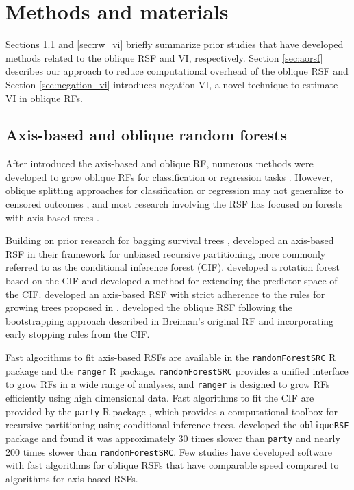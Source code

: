 \documentclass[12pt]{article}\usepackage[]{graphicx}\usepackage[]{xcolor}
\newcommand{\eg}{\textit{e.g.}}
\newcommand{\secref}[1]{Section \ref{#1}}
\begin{document}
\section{Methods and materials} \label{sec:methods}

Sections \ref{sec:rw_forests} and \ref{sec:rw_vi} briefly summarize prior studies that have developed methods related to the oblique RSF and VI, respectively. \secref{sec:aorsf} describes our approach to reduce computational overhead of the oblique RSF and \secref{sec:negation_vi} introduces negation VI, a novel technique to estimate VI in oblique RFs.

\subsection{Axis-based and oblique random forests} \label{sec:rw_forests}

After \citet{breiman2001random} introduced the axis-based and oblique RF, numerous methods were developed to grow oblique RFs for classification or regression tasks \citep{menze2011oblique, zhang2014oblique, rainforth2015canonical, zhu2015reinforcement, poona2016investigating, qiu2017oblique, tomita2020sparse, katuwal2020heterogeneous}. However, oblique splitting approaches for classification or regression may not generalize to censored outcomes \citep[\eg, see][Section~4.5.1]{zhu2013tree}, and most research involving the RSF has focused on forests with axis-based trees \citep{wang2017selective}.

Building on prior research for bagging survival trees \citep{hothorn2004bagging}, \citet{hothorn2006unbiased} developed an axis-based RSF in their framework for unbiased recursive partitioning, more commonly referred to as the conditional inference forest (CIF). \citet{zhou2016random} developed a rotation forest based on the CIF and \citet{wang2017random} developed a method for extending the predictor space of the CIF. \citet{ishwaran2008random} developed an axis-based RSF with strict adherence to the rules for growing trees proposed in \citet{breiman2001random}.  \citet{jaeger2019oblique} developed the oblique RSF following the bootstrapping approach described in Breiman's original RF and incorporating early stopping rules from the CIF.

Fast algorithms to fit axis-based RSFs are available in the \texttt{randomForestSRC} R package \citep{randomForestSRC} and the \texttt{ranger} \citep{ranger} R package. \texttt{randomForestSRC} provides a unified interface to grow RFs in a wide range of analyses, and \texttt{ranger} is designed to grow RFs efficiently using high dimensional data. Fast algorithms to fit the CIF are provided by the \texttt{party} R package \citep{hothorn2010party}, which provides a computational toolbox for recursive partitioning using conditional inference trees. \citet{jaeger2019oblique} developed the \texttt{obliqueRSF} package and found it was approximately 30 times slower than \texttt{party} and nearly 200 times slower than \texttt{randomForestSRC}. Few studies have developed software with fast algorithms for oblique RSFs that have comparable speed compared to algorithms for axis-based RSFs.
\end{document}

